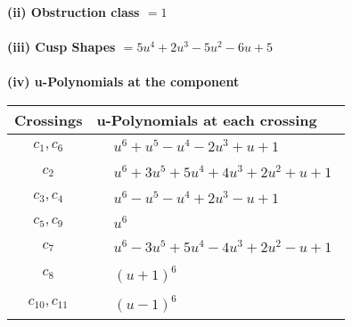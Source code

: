 \documentclass[1p]{elsarticle_modified}
\theoremstyle{definition}
\begin{document}
\flushleft \textbf{(ii) Obstruction class $= 1$}\\~\\
\flushleft \textbf{(iii) Cusp Shapes $= 5 u^4+2 u^3-5 u^2-6 u+5$}\\~\\
\newpage\renewcommand{\arraystretch}{1}
\flushleft \textbf{(iv) u-Polynomials at the component}\newline \\
\begin{tabular}{m{50pt}|m{274pt}}
Crossings & \hspace{64pt}u-Polynomials at each crossing \\
\hline $$\begin{aligned}c_{1},c_{6}\end{aligned}$$&$\begin{aligned}
&u^6+u^5- u^4-2 u^3+u+1
\end{aligned}$\\
\hline $$\begin{aligned}c_{2}\end{aligned}$$&$\begin{aligned}
&u^6+3 u^5+5 u^4+4 u^3+2 u^2+u+1
\end{aligned}$\\
\hline $$\begin{aligned}c_{3},c_{4}\end{aligned}$$&$\begin{aligned}
&u^6- u^5- u^4+2 u^3- u+1
\end{aligned}$\\
\hline $$\begin{aligned}c_{5},c_{9}\end{aligned}$$&$\begin{aligned}
&u^6
\end{aligned}$\\
\hline $$\begin{aligned}c_{7}\end{aligned}$$&$\begin{aligned}
&u^6-3 u^5+5 u^4-4 u^3+2 u^2- u+1
\end{aligned}$\\
\hline $$\begin{aligned}c_{8}\end{aligned}$$&$\begin{aligned}
&(u+1)^6
\end{aligned}$\\
\hline $$\begin{aligned}c_{10},c_{11}\end{aligned}$$&$\begin{aligned}
&(u-1)^6
\end{aligned}$\\
\hline
\end{tabular}\\~\\
\end{document}
